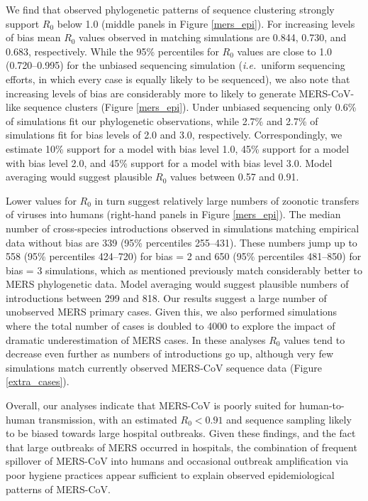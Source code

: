\documentclass[11pt,oneside,letterpaper]{article}
\begin{document}
We find that observed phylogenetic patterns of sequence clustering strongly support $R_{0}$ below 1.0 (middle panels in Figure \ref{mers_epi}).
For increasing levels of bias mean $R_{0}$ values observed in matching simulations are 0.844, 0.730, and 0.683, respectively.
While the 95\% percentiles for $R_{0}$ values are close to 1.0 (0.720--0.995) for the unbiased sequencing simulation (\textit{i.e.}\ uniform sequencing efforts, in which every case is equally likely to be sequenced), we also note that increasing levels of bias are considerably more to likely to generate MERS-CoV-like sequence clusters (Figure \ref{mers_epi}).
Under unbiased sequencing only 0.6\% of simulations fit our phylogenetic observations, while 2.7\% and 2.7\% of simulations fit for bias levels of 2.0 and 3.0, respectively.
Correspondingly, we estimate 10\% support for a model with bias level 1.0, 45\% support for a model with bias level 2.0, and 45\% support for a model with bias level 3.0.
Model averaging would suggest plausible $R_0$ values between 0.57 and 0.91.

Lower values for $R_{0}$ in turn suggest relatively large numbers of zoonotic transfers of viruses into humans (right-hand panels in Figure \ref{mers_epi}).
The median number of cross-species introductions observed in simulations matching empirical data without bias are 339 (95\% percentiles 255--431).
These numbers jump up to 558 (95\% percentiles 424--720) for bias = 2 and 650 (95\% percentiles 481--850) for bias = 3 simulations, which as mentioned previously match considerably better to MERS phylogenetic data.
Model averaging would suggest plausible numbers of introductions between 299 and 818.
Our results suggest a large number of unobserved MERS primary cases.
Given this, we also performed simulations where the total number of cases is doubled to 4000 to explore the impact of dramatic underestimation of MERS cases.
In these analyses $R_{0}$ values tend to decrease even further as numbers of introductions go up, although very few simulations match currently observed MERS-CoV sequence data (Figure \ref{extra_cases}).

Overall, our analyses indicate that MERS-CoV is poorly suited for human-to-human transmission, with an estimated $R_{0}<0.91$ and sequence sampling likely to be biased towards large hospital outbreaks.
Given these findings, and the fact that large outbreaks of MERS occurred in hospitals, the combination of frequent spillover of MERS-CoV into humans and occasional outbreak amplification via poor hygiene practices \citep{assiri_hospital_2013,chen_comparative_2017} appear sufficient to explain observed epidemiological patterns of MERS-CoV.
\end{document}

